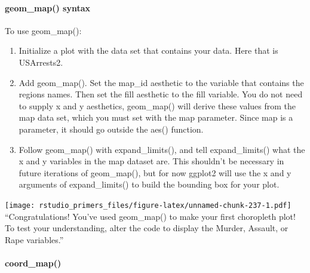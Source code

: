 \documentclass[
]{article}
\newenvironment{Shaded}{\begin{snugshade}}{\end{snugshade}}
\newcommand{\AttributeTok}[1]{\textcolor[rgb]{0.77,0.63,0.00}{#1}}
\newcommand{\FunctionTok}[1]{\textcolor[rgb]{0.00,0.00,0.00}{#1}}
\newcommand{\NormalTok}[1]{#1}
\newcommand{\SpecialCharTok}[1]{\textcolor[rgb]{0.00,0.00,0.00}{#1}}
\begin{document}
\hypertarget{geom_map-syntax}{%
\paragraph{geom\_map() syntax}\label{geom_map-syntax}}

To use geom\_map():

\begin{enumerate}
\def\labelenumi{\arabic{enumi}.}
\item
  Initialize a plot with the data set that contains your data. Here that
  is USArrests2.
\item
  Add geom\_map(). Set the map\_id aesthetic to the variable that
  contains the regions names. Then set the fill aesthetic to the fill
  variable. You do not need to supply x and y aesthetics, geom\_map()
  will derive these values from the map data set, which you must set
  with the map parameter. Since map is a parameter, it should go outside
  the aes() function.
\item
  Follow geom\_map() with expand\_limits(), and tell expand\_limits()
  what the x and y variables in the map dataset are. This shouldn't be
  necessary in future iterations of geom\_map(), but for now ggplot2
  will use the x and y arguments of expand\_limits() to build the
  bounding box for your plot.
\end{enumerate}

\begin{Shaded}
\end{Shaded}

\texttt{[image: rstudio\_primers\_files/figure-latex/unnamed-chunk-237-1.pdf]}
``Congratulations! You've used geom\_map() to make your first choropleth
plot! To test your understanding, alter the code to display the Murder,
Assault, or Rape variables.''

\hypertarget{coord_map}{%
\paragraph{coord\_map()}\label{coord_map}}
\end{document}
